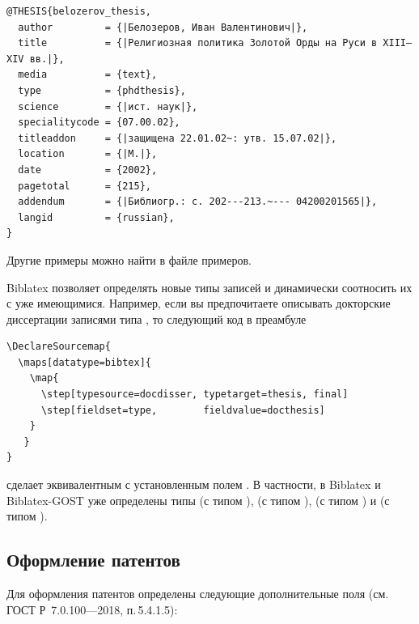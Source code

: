 \documentclass[10pt,a4paper,headings=small,numbers=enddot,english,russian]{ltxdockit}
\newcommand*{\biblatex}{Biblatex\xspace}
\newcommand*{\biblatexgost}{Biblatex-GOST\xspace}
\newcommand*{\gostbibname}[1][]{ГОСТ#1 Р~7.0.100---2018\xspace}
\newcommand*{\gostbibref}[2][]{\gostbibname[#1], п.\,#2\xspace}
\begin{document}
\begin{lstlisting}[style=bibtex,escapechar=|]
@THESIS{belozerov_thesis,
  author         = {|Белозеров, Иван Валентинович|},
  title          = {|Религиозная политика Золотой Орды на Руси в XIII—XIV вв.|},
  media          = {text},
  type           = {phdthesis},
  science        = {|ист. наук|},
  specialitycode = {07.00.02},
  titleaddon     = {|защищена 22.01.02~: утв. 15.07.02|},
  location       = {|М.|},
  date           = {2002},
  pagetotal      = {215},
  addendum       = {|Библиогр.: с. 202---213.~--- 04200201565|},
  langid         = {russian},
}
\end{lstlisting}

Другие примеры можно найти в файле примеров.

\biblatex позволяет определять новые типы записей и динамически соотносить их
с уже имеющимися.
Например, если вы предпочитаете описывать докторские диссертации записями типа
, то следующий код в преамбуле

\begin{lstlisting}[style=latex]
\DeclareSourcemap{
  \maps[datatype=bibtex]{
    \map{
      \step[typesource=docdisser, typetarget=thesis, final]
      \step[fieldset=type,        fieldvalue=docthesis]
    }
   }
}
\end{lstlisting}

\noindent сделает  эквивалентным  с установленным полем
.
В частности, в \biblatex и \biblatexgost уже определены типы  (с
типом ),  (с типом ), 
(с типом ) и  (с типом ). 


\subsection{Оформление патентов}
\label{sec:patent}

Для оформления патентов определены следующие дополнительные поля (см. \gostbibref{5.4.1.5}):
\end{document}
